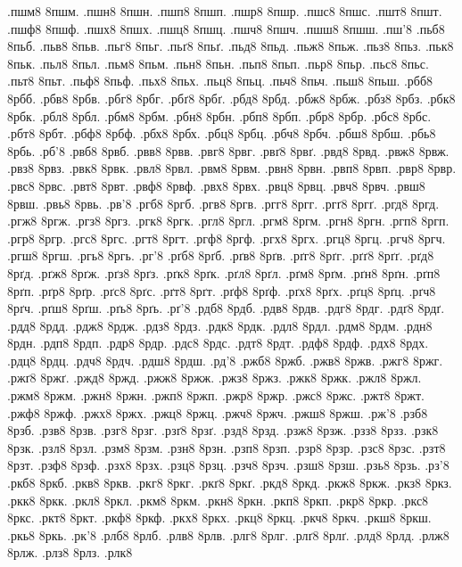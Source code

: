 {.пшм8
8пшм.
.пшн8
8пшн.
.пшп8
8пшп.
.пшр8
8пшр.
.пшс8
8пшс.
.пшт8
8пшт.
.пшф8
8пшф.
.пшх8
8пшх.
.пшц8
8пшц.
.пшч8
8пшч.
.пшш8
8пшш.
.пш'8
.пьб8
8пьб.
.пьв8
8пьв.
.пьг8
8пьг.
.пьґ8
8пьґ.
.пьд8
8пьд.
.пьж8
8пьж.
.пьз8
8пьз.
.пьк8
8пьк.
.пьл8
8пьл.
.пьм8
8пьм.
.пьн8
8пьн.
.пьп8
8пьп.
.пьр8
8пьр.
.пьс8
8пьс.
.пьт8
8пьт.
.пьф8
8пьф.
.пьх8
8пьх.
.пьц8
8пьц.
.пьч8
8пьч.
.пьш8
8пьш.
.рбб8
8рбб.
.рбв8
8рбв.
.рбг8
8рбг.
.рбґ8
8рбґ.
.рбд8
8рбд.
.рбж8
8рбж.
.рбз8
8рбз.
.рбк8
8рбк.
.рбл8
8рбл.
.рбм8
8рбм.
.рбн8
8рбн.
.рбп8
8рбп.
.рбр8
8рбр.
.рбс8
8рбс.
.рбт8
8рбт.
.рбф8
8рбф.
.рбх8
8рбх.
.рбц8
8рбц.
.рбч8
8рбч.
.рбш8
8рбш.
.рбь8
8рбь.
.рб'8
.рвб8
8рвб.
.рвв8
8рвв.
.рвг8
8рвг.
.рвґ8
8рвґ.
.рвд8
8рвд.
.рвж8
8рвж.
.рвз8
8рвз.
.рвк8
8рвк.
.рвл8
8рвл.
.рвм8
8рвм.
.рвн8
8рвн.
.рвп8
8рвп.
.рвр8
8рвр.
.рвс8
8рвс.
.рвт8
8рвт.
.рвф8
8рвф.
.рвх8
8рвх.
.рвц8
8рвц.
.рвч8
8рвч.
.рвш8
8рвш.
.рвь8
8рвь.
.рв'8
.ргб8
8ргб.
.ргв8
8ргв.
.ргг8
8ргг.
.ргґ8
8ргґ.
.ргд8
8ргд.
.ргж8
8ргж.
.ргз8
8ргз.
.ргк8
8ргк.
.ргл8
8ргл.
.ргм8
8ргм.
.ргн8
8ргн.
.ргп8
8ргп.
.ргр8
8ргр.
.ргс8
8ргс.
.ргт8
8ргт.
.ргф8
8ргф.
.ргх8
8ргх.
.ргц8
8ргц.
.ргч8
8ргч.
.ргш8
8ргш.
.ргь8
8ргь.
.рг'8
.рґб8
8рґб.
.рґв8
8рґв.
.рґг8
8рґг.
.рґґ8
8рґґ.
.рґд8
8рґд.
.рґж8
8рґж.
.рґз8
8рґз.
.рґк8
8рґк.
.рґл8
8рґл.
.рґм8
8рґм.
.рґн8
8рґн.
.рґп8
8рґп.
.рґр8
8рґр.
.рґс8
8рґс.
.рґт8
8рґт.
.рґф8
8рґф.
.рґх8
8рґх.
.рґц8
8рґц.
.рґч8
8рґч.
.рґш8
8рґш.
.рґь8
8рґь.
.рґ'8
.рдб8
8рдб.
.рдв8
8рдв.
.рдг8
8рдг.
.рдґ8
8рдґ.
.рдд8
8рдд.
.рдж8
8рдж.
.рдз8
8рдз.
.рдк8
8рдк.
.рдл8
8рдл.
.рдм8
8рдм.
.рдн8
8рдн.
.рдп8
8рдп.
.рдр8
8рдр.
.рдс8
8рдс.
.рдт8
8рдт.
.рдф8
8рдф.
.рдх8
8рдх.
.рдц8
8рдц.
.рдч8
8рдч.
.рдш8
8рдш.
.рд'8
.ржб8
8ржб.
.ржв8
8ржв.
.ржг8
8ржг.
.ржґ8
8ржґ.
.ржд8
8ржд.
.ржж8
8ржж.
.ржз8
8ржз.
.ржк8
8ржк.
.ржл8
8ржл.
.ржм8
8ржм.
.ржн8
8ржн.
.ржп8
8ржп.
.ржр8
8ржр.
.ржс8
8ржс.
.ржт8
8ржт.
.ржф8
8ржф.
.ржх8
8ржх.
.ржц8
8ржц.
.ржч8
8ржч.
.ржш8
8ржш.
.рж'8
.рзб8
8рзб.
.рзв8
8рзв.
.рзг8
8рзг.
.рзґ8
8рзґ.
.рзд8
8рзд.
.рзж8
8рзж.
.рзз8
8рзз.
.рзк8
8рзк.
.рзл8
8рзл.
.рзм8
8рзм.
.рзн8
8рзн.
.рзп8
8рзп.
.рзр8
8рзр.
.рзс8
8рзс.
.рзт8
8рзт.
.рзф8
8рзф.
.рзх8
8рзх.
.рзц8
8рзц.
.рзч8
8рзч.
.рзш8
8рзш.
.рзь8
8рзь.
.рз'8
.ркб8
8ркб.
.ркв8
8ркв.
.ркг8
8ркг.
.ркґ8
8ркґ.
.ркд8
8ркд.
.ркж8
8ркж.
.ркз8
8ркз.
.ркк8
8ркк.
.ркл8
8ркл.
.ркм8
8ркм.
.ркн8
8ркн.
.ркп8
8ркп.
.ркр8
8ркр.
.ркс8
8ркс.
.ркт8
8ркт.
.ркф8
8ркф.
.ркх8
8ркх.
.ркц8
8ркц.
.ркч8
8ркч.
.ркш8
8ркш.
.ркь8
8ркь.
.рк'8
.рлб8
8рлб.
.рлв8
8рлв.
.рлг8
8рлг.
.рлґ8
8рлґ.
.рлд8
8рлд.
.рлж8
8рлж.
.рлз8
8рлз.
.рлк8
}
